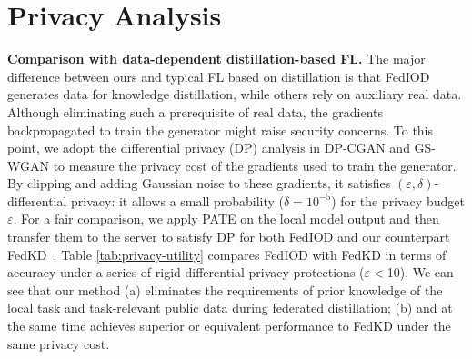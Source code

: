 \documentclass[letterpaper]{article} %
\begin{document}
\section{Privacy Analysis}
\textbf{Comparison with data-dependent distillation-based FL.}
The major difference between ours and typical FL based on distillation is that FedIOD generates data for knowledge distillation, while others rely on auxiliary real data. Although eliminating such a prerequisite of real data, the gradients backpropagated to train the generator might raise security concerns. To this point, we adopt the differential privacy (DP) analysis in DP-CGAN \cite{torkzadehmahani2019dp} and GS-WGAN \cite{chen2020gs} to measure the privacy cost of the gradients used to train the generator. By clipping and adding Gaussian noise to these gradients, it satisfies $(\varepsilon, \delta)$-differential privacy: it allows a small probability ($\delta = 10^{-5}$) for the privacy budget $\varepsilon$. For a fair comparison, we apply PATE \cite{papernot2018scalable} on the local model output and then transfer them to the server to satisfy DP for both FedIOD and our counterpart FedKD~\cite{gong2022preserving}. Table \ref{tab:privacy-utility} compares FedIOD with FedKD in terms of accuracy under a series of rigid differential privacy protections ($\varepsilon <$10). We can see that our method (a) eliminates the requirements of prior knowledge of the local task and task-relevant public data during federated distillation; (b) and at the same time achieves superior or equivalent performance to FedKD under the same privacy cost.

\end{document}

